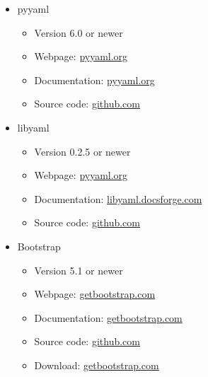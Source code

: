 \documentclass{scrreprt}
\begin{document}
\begin{itemize}
\begin{itemize}
\begin{itemize}
        \end{itemize}
        
        \item pyyaml
        \begin{itemize}
        
            \item Version 6.0 or newer
            \item Webpage: \href{https://pyyaml.org/}{pyyaml.org}
            \item Documentation: \href{https://pyyaml.org/wiki/PyYAMLDocumentation}{pyyaml.org}
            \item Source code: \href{https://github.com/yaml/pyyaml}{github.com}
        
        \end{itemize}
        
        \item libyaml
        \begin{itemize}
        
            \item Version 0.2.5 or newer
            \item Webpage: \href{https://pyyaml.org/wiki/LibYAML}{pyyaml.org}
            \item Documentation: \href{https://libyaml.docsforge.com/}{libyaml.docsforge.com}
            \item Source code: \href{https://github.com/yaml/libyaml}{github.com}
        
        \end{itemize}
        
        \item Bootstrap
        \begin{itemize}

            \item Version 5.1 or newer
            \item Webpage: \href{https://getbootstrap.com/}{getbootstrap.com}
            \item Documentation: \href{https://getbootstrap.com/docs/5.1/getting-started/introduction/}{getbootstrap.com}
            \item Source code: \href{https://github.com/twbs/bootstrap}{github.com}
            \item Download: \href{https://getbootstrap.com/docs/5.1/getting-started/download/}{getbootstrap.com}

        \end{itemize}


\end{itemize}
\end{itemize}
\end{document}
